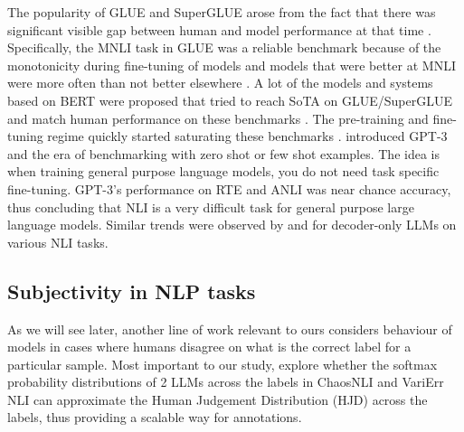 The popularity of GLUE \citep{wang2019glue} and SuperGLUE \citep{wang2019superglue} arose from the fact that there was significant visible gap between human and model performance at that time \citep{raffel2023t5}.
Specifically, the MNLI task in GLUE was a reliable benchmark because of the monotonicity during fine-tuning of models and models that were better at MNLI were more often than not better elsewhere \citep{raffel2023t5,zaheer2020big}.
A lot of the models and systems based on BERT \citep{devlin2019bert} were proposed that tried to reach SoTA on GLUE/SuperGLUE and match human performance on these benchmarks \citep{he2021deberta,he2021debertav3,patra2022englishcentric}. 
The pre-training and fine-tuning regime quickly started saturating these benchmarks \citep{raffel2023t5}.
\citet{brown2020language} introduced GPT-3 and the era of benchmarking with zero shot or few shot examples. 
The idea is when training general purpose language models, you do not need task specific fine-tuning. 
GPT-3's performance on RTE and ANLI was near chance accuracy, thus concluding that NLI is a very difficult task for general purpose large language models. 
Similar trends were observed by \citet{ohmer2024form} and \citet{weber-etal-2023-mind} for decoder-only LLMs on various NLI tasks. 


\subsection{Subjectivity in NLP tasks}
\label{related:subjectivity}
As we will see later, another line of work relevant to ours considers behaviour of models in cases where humans disagree on what is the correct label for a particular sample.
Most important to our study, \citet{chen2024seeingbig} explore whether the softmax probability distributions of 2 LLMs across the labels in ChaosNLI \citep{nie-etal-2020-learn} and VariErr NLI \citep{weber-genzel-etal-2024-varierr} can approximate the Human Judgement Distribution (HJD) across the labels, thus providing a scalable way for annotations.
